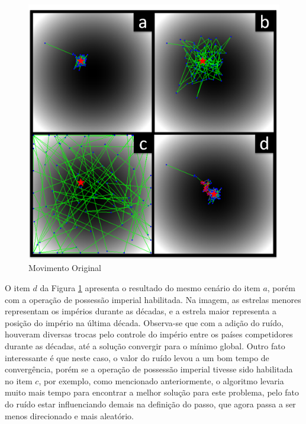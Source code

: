 \begin{figure}[h]
	\centering
	\includegraphics[scale=0.9]{Figuras/Movimento_Original.png}
	\caption{Movimento Original }
	\label{fig:Movimento_Original}
\end{figure}

O item \(d\) da Figura \ref{fig:Movimento_Original} apresenta o resultado do mesmo cenário do item \(a\), porém com a operação de possessão imperial habilitada. Na imagem, as estrelas menores representam os impérios durante as décadas, e a estrela maior representa a posição do império na última década. Observa-se que com a adição do ruído, houveram diversas trocas pelo controle do império entre os países competidores durante as décadas, até a solução convergir para o mínimo global. Outro fato interessante é que neste caso, o valor do ruído levou a um bom tempo de convergência, porém se a operação de possessão imperial tivesse sido habilitada no item \(c\), por exemplo, como mencionado anteriormente, o algoritmo levaria muito mais tempo para encontrar a melhor solução para este problema, pelo fato do ruído estar influenciando demais na definição do passo, que agora passa a ser menos direcionado e mais aleatório. 

